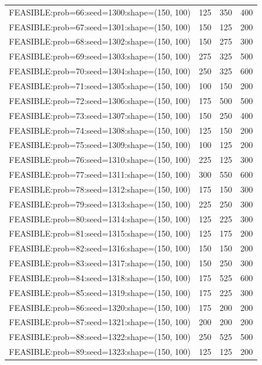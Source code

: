 \begin{longtable}{lccc}
FEASIBLE:prob=66:seed=1300:shape=(150, 100)  &  125 &   350 &    400 \\
FEASIBLE:prob=67:seed=1301:shape=(150, 100)  &  150 &   125 &    200 \\
FEASIBLE:prob=68:seed=1302:shape=(150, 100)  &  150 &   275 &    300 \\
FEASIBLE:prob=69:seed=1303:shape=(150, 100)  &  275 &   325 &    500 \\
FEASIBLE:prob=70:seed=1304:shape=(150, 100)  &  250 &   325 &    600 \\
FEASIBLE:prob=71:seed=1305:shape=(150, 100)  &  100 &   150 &    200 \\
FEASIBLE:prob=72:seed=1306:shape=(150, 100)  &  175 &   500 &    500 \\
FEASIBLE:prob=73:seed=1307:shape=(150, 100)  &  150 &   250 &    400 \\
FEASIBLE:prob=74:seed=1308:shape=(150, 100)  &  125 &   150 &    200 \\
FEASIBLE:prob=75:seed=1309:shape=(150, 100)  &  100 &   125 &    200 \\
FEASIBLE:prob=76:seed=1310:shape=(150, 100)  &  225 &   125 &    300 \\
FEASIBLE:prob=77:seed=1311:shape=(150, 100)  &  300 &   550 &    600 \\
FEASIBLE:prob=78:seed=1312:shape=(150, 100)  &  175 &   150 &    300 \\
FEASIBLE:prob=79:seed=1313:shape=(150, 100)  &  225 &   250 &    300 \\
FEASIBLE:prob=80:seed=1314:shape=(150, 100)  &  125 &   225 &    300 \\
FEASIBLE:prob=81:seed=1315:shape=(150, 100)  &  125 &   175 &    200 \\
FEASIBLE:prob=82:seed=1316:shape=(150, 100)  &  150 &   150 &    200 \\
FEASIBLE:prob=83:seed=1317:shape=(150, 100)  &  150 &   250 &    300 \\
FEASIBLE:prob=84:seed=1318:shape=(150, 100)  &  175 &   525 &    600 \\
FEASIBLE:prob=85:seed=1319:shape=(150, 100)  &  175 &   225 &    300 \\
FEASIBLE:prob=86:seed=1320:shape=(150, 100)  &  175 &   200 &    200 \\
FEASIBLE:prob=87:seed=1321:shape=(150, 100)  &  200 &   200 &    200 \\
FEASIBLE:prob=88:seed=1322:shape=(150, 100)  &  250 &   525 &    500 \\
FEASIBLE:prob=89:seed=1323:shape=(150, 100)  &  125 &   125 &    200 \\

\end{longtable}
